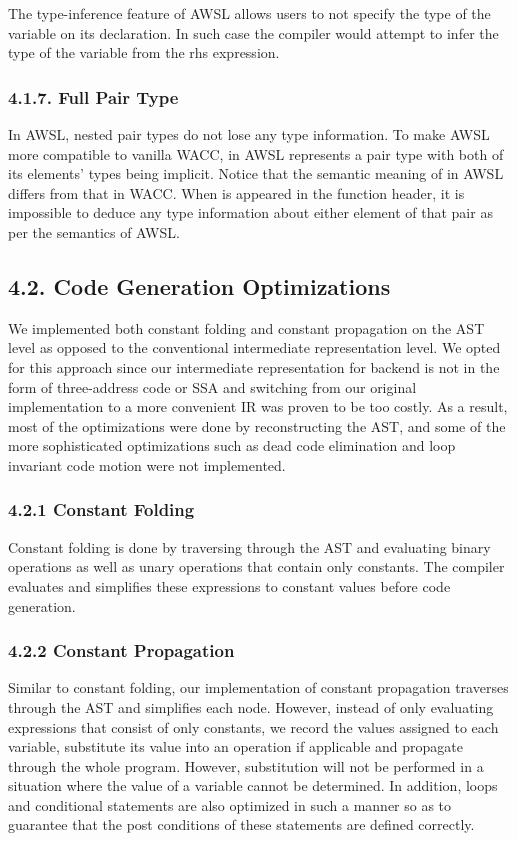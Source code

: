 \documentclass[10pt,a4paper,]{report}
\begin{document}
  The type-inference feature of AWSL allows users to not specify the type of the
  variable on its declaration. In such case the compiler would attempt to infer
  the type of the variable from the rhs expression.

  \subsubsection*{4.1.7. Full Pair Type}
  In AWSL, nested pair types do not lose any type information. To make AWSL more
  compatible to vanilla WACC,  in AWSL represents a pair type with
  both of its elements' types being implicit. Notice that the semantic meaning of
   in AWSL differs from that in WACC. When  is
  appeared in the function header, it is impossible to deduce any type
  information about either element of that pair as per the semantics of AWSL.

  \subsection*{4.2. Code Generation Optimizations}
  We implemented both constant folding and constant propagation on the AST level
  as opposed to the conventional intermediate representation level. We opted for
  this approach since our intermediate representation for backend is not in the
  form of three-address code or SSA and switching from our original
  implementation to a more convenient IR was proven to be too costly. As a
  result, most of the optimizations were done by reconstructing the AST, and
  some of the more sophisticated optimizations such as dead code elimination and
  loop invariant code motion were not implemented.

  \subsubsection*{4.2.1	Constant Folding}
  Constant folding is done by traversing through the AST and evaluating binary
  operations as well as unary operations that contain only constants.
  The compiler evaluates and simplifies these expressions to constant values
  before code generation.

  \subsubsection*{4.2.2	Constant Propagation}
  Similar to constant folding, our implementation of constant propagation
  traverses through the AST and simplifies each node. However, instead of 
  only evaluating expressions that consist of only constants, we record the
  values assigned to each variable, substitute its value into an operation if
  applicable and propagate through the whole program. However, substitution will
  not be performed in a situation where the value of a variable cannot be
  determined. In addition, loops and conditional statements are also optimized
  in such a manner so as to guarantee that the post conditions of these
  statements are defined correctly.
\end{document}
